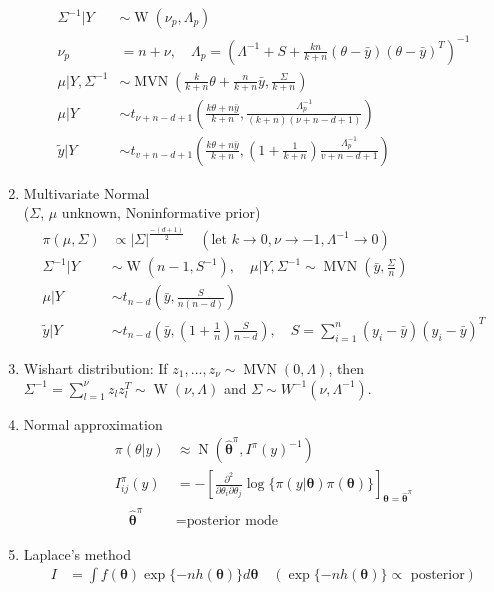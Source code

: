 \documentclass[10pt,landscape]{article}
\newcommand{\N}{\operatorname{N}}
\newcommand{\MVN}{\operatorname{MVN}}
\newcommand{\W}{\operatorname{W}}
\begin{document}
\begin{multicols}{3}
\begin{enumerate}
\begin{align*}
    \Sigma^{-1} | Y & \sim \W(\nu_p, \Lambda_p) \\
    \nu_p & = n + \nu, \quad \Lambda_p = \left(\Lambda^{-1}+S+\frac{kn}{k+n}(\theta-\bar{y})(\theta-\bar{y})^T\right)^{-1} \\
    \mu | Y, \Sigma^{-1} & \sim \MVN \left(\frac{k}{k+n}\theta + \frac{n}{k+n}\bar{y}, \frac{\Sigma}{k+n}\right) \\
    \mu | Y & \sim t_{\nu+n-d+1}\left(\frac{k\theta+n\bar{y}}{k+n}, \frac{\Lambda_p^{-1}}{(k+n)(\nu+n-d+1)}\right) \\
    \tilde{y} | Y & \sim t_{v+n-d+1}\left(\frac{k\theta+n\bar{y}}{k+n}, \left(1 + \frac{1}{k+n}\right)\frac{\Lambda_p^{-1}}{v+n-d+1}\right)
  \end{align*}
\item Multivariate Normal \\
  ($\Sigma$, $\mu$ unknown, Noninformative prior)
  \begin{align*}
    \pi(\mu,\Sigma) & \propto |\Sigma|^{\frac{-(d+1)}{2}} \quad (\text{let } k \to 0, \nu \to -1, \Lambda^{-1} \to 0) \\
    \Sigma^{-1} | Y & \sim \W(n-1, S^{-1}), \quad \mu|Y, \Sigma^{-1} \sim \MVN(\bar{y}, \frac{\Sigma}{n}) \\
    \mu | Y & \sim t_{n-d}\left(\bar{y}, \frac{S}{n(n-d)}\right) \\
    \tilde{y} | Y & \sim t_{n-d}\left(\bar{y}, \left(1 + \frac{1}{n}\right) \frac{S}{n-d} \right), \quad S = \sum_{i=1}^n (y_i - \bar{y})(y_i-\bar{y})^T
  \end{align*}
\item Wishart distribution:
  If $z_1, \ldots, z_\nu \sim \MVN(0, \Lambda)$, then $\Sigma^{-1} = \sum_{l=1}^\nu z_l z_l^T \sim \W(\nu, \Lambda)$ and $\Sigma \sim W^{-1}(\nu, \Lambda^{-1})$.
\item Normal approximation
  \begin{align*}
    \pi(\theta|y) & \approx \N(\bm{\hat{\theta}}^\pi, I^\pi(y)^{-1}) \\
    I_{ij}^\pi(y) & = -[\frac{\partial^2}{\partial\theta_i\partial\theta_j} \log\{\pi(y|\bm{\theta})\pi(\bm{\theta})\}]_{\bm{\theta} = \bm{\hat{\theta}}^\pi} \\
    \quad \bm{\hat{\theta}}^\pi & = \text{posterior mode}
  \end{align*}
\item Laplace's method
  \begin{align*}
    I & = \int f(\bm{\theta}) \exp\{-nh(\bm{\theta})\}d\bm{\theta} \quad (\text{$\exp\{-nh(\bm{\theta})\} \propto$ posterior}) 

\end{align*}
\end{enumerate}
\end{multicols}
\end{document}

